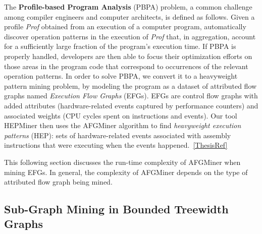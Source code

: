 The  {\bf Profile-based Program Analysis} (PBPA) problem, a common challenge among compiler engineers and computer architects, is defined as follows. Given a profile {\em Prof} obtained from an execution of a computer program, automatically discover operation patterns in the execution of {\em Prof} that, in aggregation, account for a sufficiently large fraction of the program's execution time. If PBPA is properly handled, developers are then able to focus their optimization efforts on those areas in the program code that correspond to occurrences of the relevant operation patterns. In order to solve PBPA, we convert it to a heavyweight pattern mining problem, by modeling the program as a dataset of attributed flow graphs named \emph{Execution Flow Graphs} (EFGs). EFGs are control flow graphs with added attributes (hardware-related events captured by performance counters) and associated weights (CPU cycles spent on instructions and events). Our tool HEPMiner then uses the AFGMiner algorithm to find \emph{heavyweight execution patterns} (HEP): sets of hardware-related events associated with assembly instructions that were executing when the events happened.~\ref{ThesisRef}

This following section discusses the run-time complexity of AFGMiner when mining EFGs. In general, the complexity of AFGMiner depends on the type of attributed flow graph being mined.

\subsection{Sub-Graph Mining in Bounded Treewidth Graphs}

